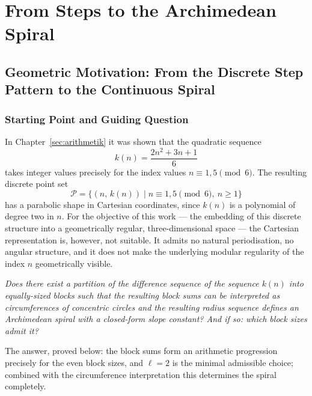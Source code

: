 \chapter{From Steps to the Archimedean Spiral}\label{sec:spirale}

\section{Geometric Motivation: From the Discrete Step Pattern to the
Continuous Spiral}

\subsection{Starting Point and Guiding Question}

In Chapter~\ref{sec:arithmetik} it was shown that the quadratic sequence
\[
  k(n) = \frac{2n^2 + 3n + 1}{6}
\]
takes integer values precisely for the index values $n \equiv 1, 5 \pmod{6}$.
The resulting discrete point set
\[
  \mathcal{P} = \bigl\{(n,\, k(n)) \mid n \equiv 1, 5 \pmod{6},\ n \geq 1\bigr\}
\]
has a parabolic shape in Cartesian coordinates, since $k(n)$ is a polynomial
of degree two in $n$. For the objective of this work --- the embedding of this
discrete structure into a geometrically regular, three-dimensional space --- the
Cartesian representation is, however, not suitable. It admits no natural
periodisation, no angular structure, and it does not make the underlying modular
regularity of the index $n$ geometrically visible.

\begin{tcolorbox}[
  title={Guiding question of this chapter},
  colback=gray!5,
  colframe=gray!50!black,
  enhanced,
  breakable
]
\emph{Does there exist a partition of the difference sequence of the
sequence $k(n)$ into equally-sized blocks such that the resulting block
sums can be interpreted as circumferences of concentric circles and the
resulting radius sequence defines an Archimedean spiral with a closed-form
slope constant? And if so: which block sizes admit it?}
\end{tcolorbox}

The answer, proved below: the block sums form an arithmetic progression
precisely for the even block sizes, and $\ell = 2$ is the minimal
admissible choice; combined with the circumference interpretation this
determines the spiral completely.

